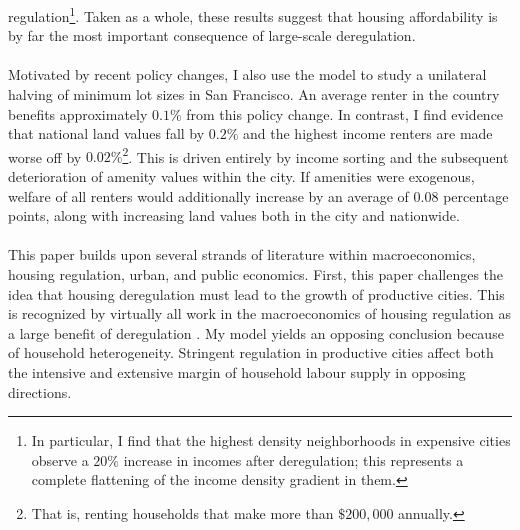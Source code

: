\documentclass[12pt]{article}
\begin{document}
regulation\footnote{In particular, I find that the highest density neighborhoods in expensive cities observe a $20 \%$ increase in incomes after deregulation; this represents a complete flattening of the income density gradient in them.}. Taken as a whole, these results suggest that housing affordability is by far the most important consequence of large-scale deregulation. 
	
	\paragraph*{}
	Motivated by recent policy changes, I also use the model to study a unilateral halving of minimum lot sizes in San Francisco. An average renter in the country benefits approximately $0.1 \%$ from this policy change. In contrast, I find evidence that national land values fall by $0.2\%$ and the highest income renters are made worse off by $0.02\%$\footnote{That is, renting households that make more than $\$200,000$ annually.}. This is driven entirely by income sorting and the subsequent deterioration of amenity values within the city. If amenities were exogenous, welfare of all renters would additionally increase by an average of $0.08$ percentage points, along with increasing land values both in the city and nationwide.
	
	\paragraph*{}
	This paper builds upon several strands of literature within  macroeconomics, housing regulation, urban, and public economics. First, this paper challenges the idea that housing deregulation must lead to the growth of productive cities. This is recognized by virtually all work in the macroeconomics of housing regulation as a large benefit of deregulation \citep{hseihmoretti, durantonpugaurbgrowth, parkho, hop, bunten}. My model yields an opposing conclusion because of household heterogeneity. Stringent regulation in productive cities affect both the intensive and extensive margin of household labour supply in opposing directions. 
	
\end{document}
